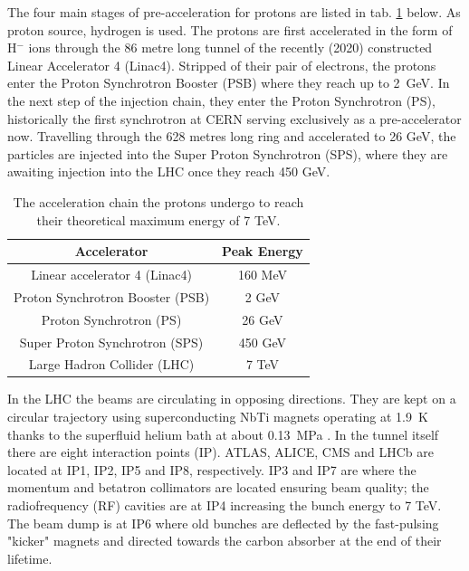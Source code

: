 The four main stages of pre-acceleration for protons are listed in tab. \ref{tab:preaccelerators} below. As proton source, hydrogen is used. The protons are first accelerated in the form of H$^-$ ions through the 86 metre long tunnel of the recently (2020) constructed Linear Accelerator 4 (Linac4). Stripped of their pair of electrons, the protons enter the Proton Synchrotron Booster (PSB) where they reach up to \SI{2}{\giga\electronvolt}. In the next step of the injection chain, they enter the Proton Synchrotron (PS), historically the first synchrotron at CERN serving exclusively as a pre-accelerator now. Travelling through the 628 metres long ring and accelerated to 26 GeV, the particles are injected into the Super Proton Synchrotron (SPS), where they are awaiting injection into the LHC once they reach 450 GeV.


\begin{table}[h!]
	\centering
	\begin{tabular}{c|c}
		Accelerator & Peak Energy \\
		\hline
		\hline
		Linear accelerator 4 (Linac4) & 160 MeV \\
		\hline
		Proton Synchrotron Booster (PSB) & 2 GeV \\
		\hline
		Proton Synchrotron (PS) & 26 GeV \\
		\hline
		Super Proton Synchrotron (SPS) & 450 GeV \\
		\hline
		Large Hadron Collider (LHC) & 7 TeV \\
	\end{tabular}
	\caption{The acceleration chain the protons undergo to reach their theoretical maximum energy of 7 TeV.}
	\label{tab:preaccelerators}
\end{table}

In the LHC the beams are circulating in opposing directions. They are kept on a circular trajectory using superconducting NbTi magnets operating at \SI{1.9}{\kelvin} thanks to the superfluid helium bath at about \SI{0.13}{\mega\pascal} \cite{Bruning:782076}. In the tunnel itself there are eight interaction points (IP). ATLAS, ALICE, CMS and LHCb are located at IP1, IP2, IP5 and IP8, respectively. IP3 and IP7 are where the momentum and betatron collimators are located ensuring beam quality; the radiofrequency (RF) cavities are at IP4 increasing the bunch energy to 7 TeV. The beam dump is at IP6 where old bunches are deflected by the fast-pulsing "kicker" magnets and directed towards the carbon absorber at the end of their lifetime. \cite{Evans_2008}

